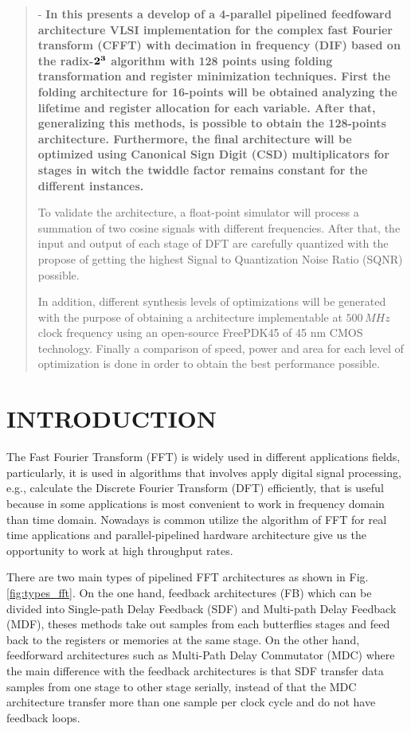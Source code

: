 \documentclass[journal,comsoc]{IEEEtran}
\begin{document}
\begin{abstract} - \bf In this presents a develop of a 4-parallel pipelined feedfoward architecture VLSI implementation for the complex fast Fourier transform (CFFT) with decimation in frequency (DIF) based on the radix-$\bf 2^3$ algorithm with 128 points using folding transformation and register minimization techniques. First the folding architecture for 16-points will be obtained analyzing the lifetime and register allocation for each variable. After that, generalizing this methods, is possible to obtain the 128-points architecture. Furthermore, the final architecture will be optimized using Canonical Sign Digit (CSD) multiplicators for stages in witch the twiddle factor remains constant for the different instances. 

To validate the architecture, a float-point simulator will process a summation of two cosine signals with different frequencies. After that, the input and output of each stage of DFT are carefully quantized with the propose of getting the highest Signal to Quantization Noise Ratio (SQNR) possible.

In addition, different synthesis levels of optimizations will be generated with the purpose of obtaining a architecture implementable at $500\,MHz$ clock frequency using an open-source FreePDK45 of 45 nm CMOS technology. Finally a comparison of speed, power and area for each level of optimization is done in order to obtain the best performance possible.

\end{abstract}
\section{INTRODUCTION}
The Fast Fourier Transform (FFT) is widely used in different applications fields, particularly, it is used in algorithms that involves apply digital signal processing, e.g., calculate the Discrete Fourier Transform (DFT) efficiently, that is useful because in some applications is most convenient to work in frequency domain than time domain. Nowadays is common utilize the algorithm of FFT for real time applications and parallel-pipelined hardware architecture give us the opportunity to work at high throughput rates.

There are two main types of pipelined FFT architectures \cite{shousheng_he_designing_1998} as shown in Fig. \ref{fig:types_fft}. On the one hand, feedback architectures (FB) which can be divided into Single-path Delay Feedback (SDF) and Multi-path Delay Feedback (MDF), theses methods take out samples from each butterflies stages and feed back to the registers or memories at the same stage. On the other hand, feedforward architectures such as Multi-Path Delay Commutator (MDC) where the main difference with the feedback architectures is that SDF transfer data samples from one stage to other stage serially, instead of that the MDC architecture transfer more than one sample per clock cycle and do not have feedback loops.
\end{document}

